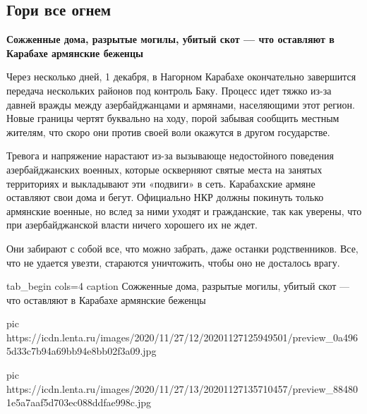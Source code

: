  
 
 
 
 
 
\subsection{Гори все огнем}
\label{sec:29_11_2020.news.ru.lenta_ru.1.gori_vse_ognem}


\begin{leftbar}
\bfseries\Large\color{red}
Сожженные дома, разрытые могилы, убитый скот — что оставляют в Карабахе армянские беженцы
\end{leftbar}

Через несколько дней, 1 декабря, в Нагорном Карабахе окончательно завершится
передача нескольких районов под контроль Баку. Процесс идет тяжко из-за давней
вражды между азербайджанцами и армянами, населяющими этот регион. Новые границы
чертят буквально на ходу, порой забывая сообщить местным жителям, что скоро они
против своей воли окажутся в другом государстве.

Тревога и напряжение нарастают из-за вызывающе недостойного поведения
азербайджанских военных, которые оскверняют святые места на занятых территориях
и выкладывают эти «подвиги» в сеть. Карабахские армяне оставляют свои дома и
бегут. Официально НКР должны покинуть только армянские военные, но вслед за
ними уходят и гражданские, так как уверены, что при азербайджанской власти
ничего хорошего их не ждет.

Они забирают с собой все, что можно забрать, даже останки родственников. Все,
что не удается увезти, стараются уничтожить, чтобы оно не досталось врагу.

\ifcmt
tab_begin cols=4
  caption Сожженные дома, разрытые могилы, убитый скот — что оставляют в Карабахе армянские беженцы

pic https://icdn.lenta.ru/images/2020/11/27/12/20201127125949501/preview_0a4965d33c7b94a69bb94e8bb02f3a09.jpg

pic https://icdn.lenta.ru/images/2020/11/27/13/20201127135710457/preview_884801e5a7aaf5d703ec088ddfae998c.jpg

